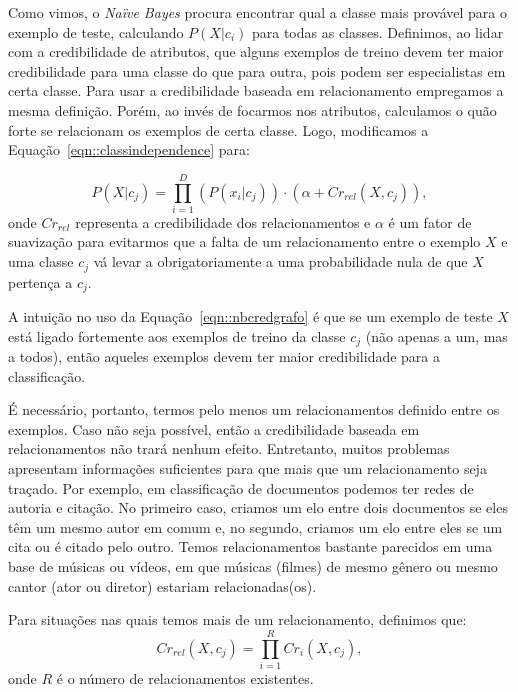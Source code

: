 Como vimos, o \textit{Naïve Bayes} procura encontrar qual a classe mais provável para o exemplo de teste, calculando $P(X|c_i)$ para todas as classes. Definimos, ao lidar com a credibilidade de atributos, que alguns exemplos de treino devem ter maior credibilidade para uma classe do que para outra, pois podem ser especialistas em certa classe. Para usar a credibilidade baseada em relacionamento empregamos a mesma definição. Porém, ao invés de focarmos nos atributos, calculamos o quão forte se relacionam os exemplos de certa classe. Logo, modificamos a Equação~\ref{eqn::classindependence} para:

\begin{equation}\label{eqn::nbcredgrafo}
P(X|c_{j}) = \prod^{D}_{i=1}{(P(x_i|c_j)) \cdot (\alpha + Cr_{rel}(X,c_j)) },
\end{equation}
onde $Cr_{rel}$ representa a credibilidade dos relacionamentos e $\alpha$ é um fator de suavização para evitarmos que a falta de um relacionamento entre o exemplo $X$ e uma classe $c_j$ vá levar a obrigatoriamente a uma probabilidade nula de que $X$ pertença a $c_j$.

A intuição no uso da Equação~\ref{eqn::nbcredgrafo} é que se um exemplo de teste $X$ está ligado fortemente aos exemplos de treino da classe $c_j$ (não apenas a um, mas a todos), então aqueles exemplos devem ter maior credibilidade para a classificação. %

É necessário, portanto, termos pelo menos um relacionamentos definido entre os exemplos. Caso não seja possível, então a credibilidade baseada em relacionamentos não trará nenhum efeito. Entretanto, muitos problemas apresentam informações suficientes para que mais que um relacionamento seja traçado. Por exemplo, em classificação de documentos podemos ter redes de autoria e citação.
No primeiro caso, criamos um elo entre dois documentos se eles têm um mesmo autor em comum e, no segundo, criamos um elo entre eles se um cita ou é citado pelo outro. 
Temos relacionamentos bastante parecidos em uma base de músicas ou vídeos, em que músicas (filmes) de mesmo gênero ou mesmo cantor (ator ou diretor) estariam relacionadas(os). 

Para situações nas quais temos mais de um relacionamento, definimos que:
\begin{equation}\label{eqn::nbcredgrafo}
Cr_{rel}(X, c_j) = \prod^{R}_{i=1} {Cr_{i}(X,c_j)},
\end{equation}
onde $R$ é o número de relacionamentos existentes. %


